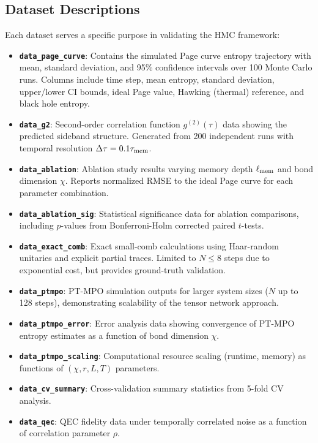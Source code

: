 \documentclass[a4paper,11pt]{article}
\newcommand{\HMC}{\textup{\textsc{HMC}}\xspace}
\theoremstyle{plain}
\theoremstyle{definition}
\theoremstyle{remark}
\begin{document}
\subsection{Dataset Descriptions}
Each dataset serves a specific purpose in validating the \HMC{} framework:

\begin{itemize}[leftmargin=*]
\item \textbf{\texttt{data\_page\_curve}}: Contains the simulated Page curve entropy trajectory with mean, standard deviation, and 95\% confidence intervals over 100 Monte Carlo runs. Columns include time step, mean entropy, standard deviation, upper/lower CI bounds, ideal Page value, Hawking (thermal) reference, and black hole entropy.

\item \textbf{\texttt{data\_g2}}: Second-order correlation function $g^{(2)}(\tau)$ data showing the predicted sideband structure. Generated from 200 independent runs with temporal resolution $\Delta\tau = 0.1\tau_{\rm mem}$.

\item \textbf{\texttt{data\_ablation}}: Ablation study results varying memory depth $\ell_{\rm mem}$ and bond dimension $\chi$. Reports normalized RMSE to the ideal Page curve for each parameter combination.

\item \textbf{\texttt{data\_ablation\_sig}}: Statistical significance data for ablation comparisons, including $p$-values from Bonferroni-Holm corrected paired $t$-tests.

\item \textbf{\texttt{data\_exact\_comb}}: Exact small-comb calculations using Haar-random unitaries and explicit partial traces. Limited to $N \leq 8$ steps due to exponential cost, but provides ground-truth validation.

\item \textbf{\texttt{data\_ptmpo}}: PT-MPO simulation outputs for larger system sizes ($N$ up to 128 steps), demonstrating scalability of the tensor network approach.

\item \textbf{\texttt{data\_ptmpo\_error}}: Error analysis data showing convergence of PT-MPO entropy estimates as a function of bond dimension $\chi$.

\item \textbf{\texttt{data\_ptmpo\_scaling}}: Computational resource scaling (runtime, memory) as functions of $(\chi, r, L, T)$ parameters.

\item \textbf{\texttt{data\_cv\_summary}}: Cross-validation summary statistics from 5-fold CV analysis.

\item \textbf{\texttt{data\_qec}}: QEC fidelity data under temporally correlated noise as a function of correlation parameter $\rho$.
\end{itemize}
\end{document}
